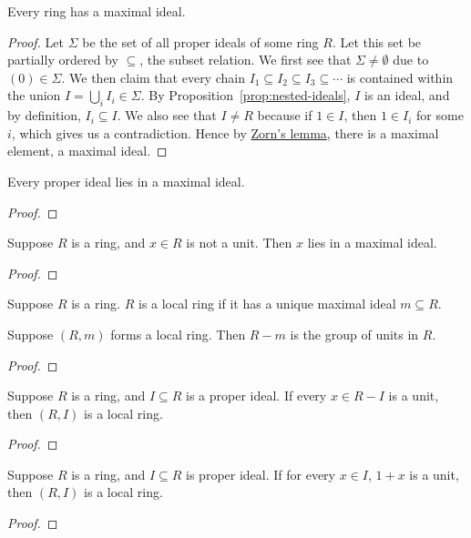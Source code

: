 \begin{theorem}
    Every ring has a maximal ideal.
\end{theorem}
\begin{proof}
    Let \(\Sigma\) be the set of all proper ideals of some ring \(R\).
    Let this set be partially ordered by \(\subseteq\), the subset relation.
    We first see that \(\Sigma\neq\emptyset\) due to \((0) \in \Sigma\).
    We then claim that every chain \(I_1 \subseteq I_2 \subseteq I_3 \subseteq \cdots\)
    is contained within the union \(I = \bigcup_i I_i \in \Sigma\).
    By Proposition~\ref{prop:nested-ideals}, \(I\) is an ideal,
    and by definition, \(I_i \subseteq I\).
    We also see that \(I \neq R\) because if \(1 \in I\),
    then \(1 \in I_i\) for some \(i\), which gives us a contradiction.
    Hence by \hyperref[ax:zorn]{Zorn's lemma}, there is a maximal element, a maximal ideal.
\end{proof}
\begin{corollary}
    Every proper ideal lies in a maximal ideal.
\end{corollary}
\begin{proof}
    
\end{proof}
\begin{corollary}
    Suppose \(R\) is a ring, and \(x \in R\) is not a unit.
    Then \(x\) lies in a maximal ideal.
\end{corollary}
\begin{proof}
    
\end{proof}

\begin{definition}
    Suppose \(R\) is a ring.
    \(R\) is a local ring if it has a unique maximal ideal \(m \subseteq R\).
\end{definition}
\begin{theorem}
    Suppose \((R,m)\) forms a local ring.
    Then \(R-m\) is the group of units in \(R\).
\end{theorem}
\begin{proof}
    
\end{proof}
\begin{theorem}
    Suppose \(R\) is a ring, and \(I \subseteq R\) is a proper ideal.
    If every \(x \in R-I\) is a unit, then \((R,I)\) is a local ring.
\end{theorem}
\begin{proof}
    
\end{proof}
\begin{theorem}
    Suppose \(R\) is a ring, and \(I \subseteq R\) is proper ideal.
    If for every \(x \in I\), \(1+x\) is a unit, then \((R,I)\) is a local ring.
\end{theorem}
\begin{proof}
    
\end{proof}

